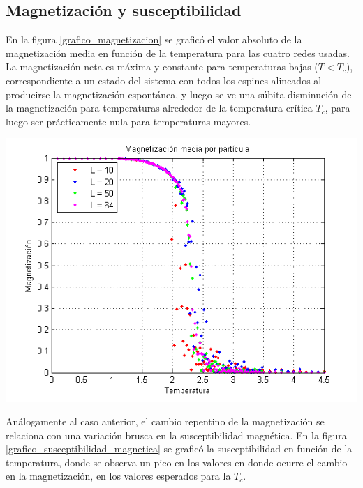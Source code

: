 \documentclass[twocolumn,Spanish,a4paper,11pt]{article}
\begin{document}
\subsection{Magnetización y susceptibilidad}

En la figura \ref{grafico_magnetizacion} se graficó el valor absoluto de la
magnetización media en función de la temperatura
para las cuatro redes usadas. La magnetización neta
es máxima y constante para temperaturas bajas ($T<T_c$), correspondiente a un estado del sistema con todos
los espines alineados al producirse la magnetización
espontánea, y luego se ve una súbita disminución de la magnetización
para temperaturas alrededor de la temperatura crítica
$T_c$, para luego ser prácticamente nula para temperaturas
mayores.

\begin{minipage}{0.45\textwidth}									
\centering
\includegraphics[totalheight=0.25\textheight]{figuras/magnetizacion.png}
\label{grafico_magnetizacion}
\end{minipage}

Análogamente al caso anterior, el cambio repentino de
la magnetización se relaciona con una variación brusca en la susceptibilidad magnética. En la
figura \ref{grafico_susceptibilidad_magnetica} se graficó la susceptibilidad en función de la
temperatura, donde se observa un pico en los valores
en donde ocurre el cambio en la magnetización, en
los valores esperados para la $T_c$.
\end{document}

